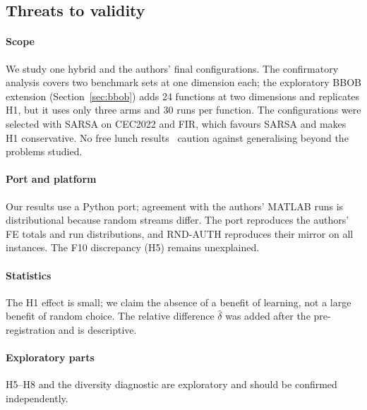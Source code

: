 \documentclass[11pt]{article}
\theoremstyle{definition}
\theoremstyle{remark}
\begin{document}
\subsection{Threats to validity}
\paragraph{Scope} We study one hybrid and the authors' final configurations. The confirmatory analysis covers two benchmark
sets at one dimension each; the exploratory BBOB extension (Section~\ref{sec:bbob}) adds 24 functions at two dimensions and
replicates H1, but it uses only three arms and 30 runs per function. The configurations were selected with SARSA on
CEC2022 and FIR, which favours SARSA and makes H1 conservative. No free lunch results~\citep{wolpert1997nfl} caution against
generalising beyond the problems studied.

\paragraph{Port and platform} Our results use a Python port; agreement with the authors' MATLAB runs is distributional
because random streams differ. The port reproduces the authors' FE totals and run distributions, and RND-AUTH reproduces
their mirror on all instances. The F10 discrepancy (H5) remains unexplained.

\paragraph{Statistics} The H1 effect is small; we claim the absence of a benefit of learning, not a large benefit of random
choice. The relative difference $\hat\delta$ was added after the pre-registration and is descriptive.

\paragraph{Exploratory parts} H5--H8 and the diversity diagnostic are exploratory and should be confirmed independently.

\end{document}

